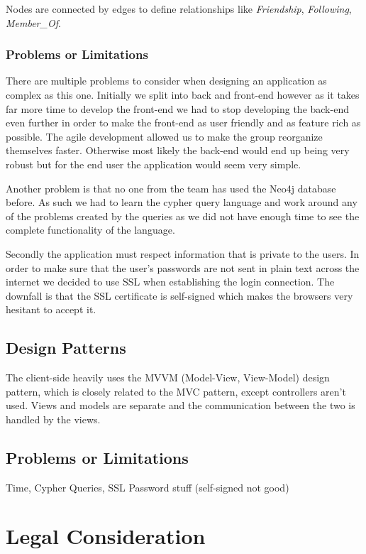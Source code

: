 \documentclass[11pt]{article}
\begin{document}
Nodes are connected by edges to define relationships like \textit{Friendship}, \textit{Following}, \textit{Member\_Of}.

\subsubsection{Problems or Limitations}

There are multiple problems to consider when designing an application as complex as this one.
Initially we split into back and front-end however as it takes far more time to develop the front-end we had to stop developing the back-end even further in order to make the front-end as user friendly and as feature rich as possible.
The agile development allowed us to make the group reorganize themselves faster. Otherwise most likely the back-end would end up being very robust but for the end user the application would seem very simple.

Another problem is that no one from the team has used the Neo4j database before. As such we had to learn the cypher query language and work around any of the problems created by the queries as we did not have enough time to see the complete functionality of the language.

Secondly the application must respect information that is private to the users. In order to make sure that the user's passwords are not sent in plain text across the internet we decided to use SSL when establishing the login connection.
The downfall is that the SSL certificate is self-signed which makes the browsers very hesitant to accept it.

\subsection{Design Patterns}

The client-side heavily uses the MVVM (Model-View, View-Model) design pattern, which is closely related to the MVC pattern, except controllers aren't used. Views and models are separate and the communication between the two is handled by the views.

\subsection {Problems or Limitations}
	Time, Cypher Queries, SSL Password stuff (self-signed not good)


\section {Legal Consideration}
\end{document}
